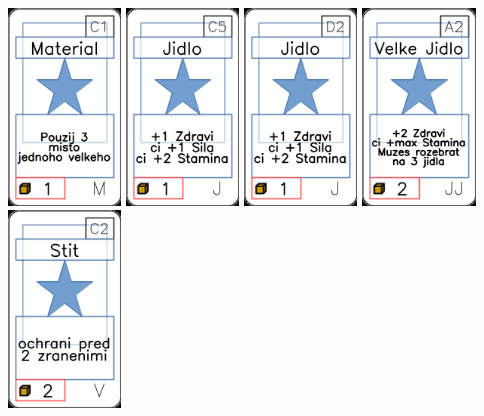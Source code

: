 \documentclass[a4paper]{article}
\begin{document}
	\includegraphics[width=3.0cm]{img-1_40}
	\includegraphics[width=3.0cm]{img-1_14}
	\includegraphics[width=3.0cm]{img-1_16}
	\includegraphics[width=3.0cm]{img-1_31}
	\includegraphics[width=3.0cm]{img-1_71}
\end{document}

